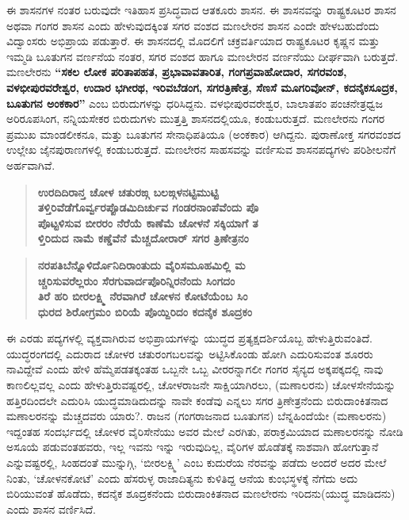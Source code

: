 ಈ ಶಾಸನಗಳ ನಂತರ ಬರುವುದೇ ಇತಿಹಾಸ ಪ್ರಸಿದ್ಧವಾದ ಆತಕೂರು ಶಾಸನ. ಈ ಶಾಸನವನ್ನು ರಾಷ್ಟ್ರಕೂಟರ ಶಾಸನ ಅಥವಾ ಗಂಗರ ಶಾಸನ ಎಂದು ಹೇಳುವುದಕ್ಕಿಂತ ಸಗರ ವಂಶದ ಮಣಲೇರನ ಶಾಸನ ಎಂದೇ ಹೇಳಬಹುದೆಂದು ವಿದ್ವಾಂಸರು ಅಭಿಪ್ರಾಯ ಪಡುತ್ತಾರೆ. ಈ ಶಾಸನದಲ್ಲಿ ಮೊದಲಿಗೆ ಚಕ್ರವರ್ತಿಯಾದ ರಾಷ್ಟ್ರಕೂಟರ ಕೃಷ್ಣನ ಮತ್ತು ಇಮ್ಮಡಿ ಬೂತುಗನ ವರ್ಣನೆಯ ನಂತರ, ಸಗರ ವಂಶದ ಹಾಗೂ ಮಣಲೇರನ ವರ್ಣನೆಯು ದೀರ್ಘವಾಗಿ ಬರುತ್ತದೆ. ಮಣಲೇರನು \textbf{“ಸಕಲ ಲೋಕ ಪರಿತಾಪಹತ, ಪ್ರಭಾವಾವತಾರಿತ, ಗಂಗಪ್ರವಾಹೋದಾರ, ಸಗರವಂಶ, ವಳಭೀಪುರವರೇಶ್ವರ, ಉದಾರ ಭಗೀರಥ, ಇರಿವಬೆಡಂಗ, ಸಗರತ್ರಿಣೇತ್ರ, ಸೆಣಸೆ ಮೂಗರಿವೋನ್​, ಕದನೈಕಸೂದ್ರಕ, ಬೂತುಗನ ಅಂಕಕಾರ”} ಎಂಬ ಬಿರುದುಗಳನ್ನು ಧರಿಸಿದ್ದನು. ವಳಭೀಪುರವರೇಶ್ವರ, ಬಾಲಾತಪಂ ಪಂಚನೇತ್ರಧ್ವಜ ಅರಿರೂಪಸಿಂಗ, ನನ್ನಿಯಸೇಕರ ಬಿರುದುಗಳು ಮುತ್ತತ್ತಿ ಶಾಸನದಲ್ಲಿಯೂ, ಕಂಡುಬರುತ್ತದೆ. ಮಣಲೇರನು ಗಂಗರ ಪ್ರಮುಖ ಮಾಂಡಲೀಕನೂ, ಮತ್ತು ಬೂತುಗನ ಸೇನಾಧಿಪತಿಯೂ (ಅಂಕಕಾರ) ಆಗಿದ್ದನು. ಪುರಾಣೋಕ್ತ ಸಗರವಂಶದ ಉಲ್ಲೇಖ ಜೈನಪುರಾಣಗಳಲ್ಲಿ ಕಂಡುಬರುತ್ತದೆ. ಮಣಲೇರನ ಸಾಹಸವನ್ನು ವರ್ಣಿಸುವ ಶಾಸನಪದ್ಯಗಳು ಪರಿಶೀಲನೆಗೆ ಅರ್ಹವಾಗಿವೆ.

\begin{verse}
\textbf{ಉರದಿದಿರಾನ್ತ ಚೋಳ ಚತುರಙ್ಗ ಬಲಙ್ಗಳನಟ್ಟಿಮುಟ್ಟಿ} \\\textbf{ತಳ್ತಿರಿವೆಡೆಗೊರ್ವ್ವರಪ್ಪೊಡಮಿದಿರ್ಚುವ ಗಂಡರನಾಂಪೆವೆಂದು ಪೊ} \\\textbf{ಪೊಟ್ಟಳಿಸುವ ಬೀರರಂ ನೆರೆಯೆ ಕಾಣೆಮೆ ಚೋಳನೆ ಸಕ್ಕಿಯಾಗೆ ತ} \\\textbf{ಳ್ತಿರಿದುದ ನಾಮೆ ಕಣ್ಡೆವೆನೆ ಮೆಚ್ಚದೋರಾರ್​ ಸಗರ ತ್ರಿಣೇತ್ರನಂ}
\end{verse}

\begin{verse}
\textbf{ನರಪತಿಬೆನ್ನೊಳಿರ್ದೊನಿದಿರಾಂತುದು ವೈರಿಸಮೂಹಮಿಲ್ಲಿ ಮ} \\\textbf{ಚ್ಚರಿಸುವರೆಲ್ಲರುಂ ಸೆರಗುವಾರ್ದಪೊರಿನ್ನಿರನೆಂದು ಸಿಂಗದಂ} \\\textbf{ತಿರೆ ಹರಿ ಬೀರಲಕ್ಷ್ಮಿ ನೆರವಾಗಿರೆ ಚೋಳನ ಕೋಟೆಯೆಂಬ ಸಿಂ} \\\textbf{ಧುರದ ಶಿರೋಗ್ರಮಂ ಬಿರಿಯೆ ಪೊಯ್ದಿರಿದಂ ಕದನೈಕ ಶೂದ್ರಕಂ}
\end{verse}

ಈ ಎರಡು ಪದ್ಯಗಳಲ್ಲಿ ವ್ಯಕ್ತವಾಗಿರುವ ಅಭಿಪ್ರಾಯಗಳನ್ನು ಯುದ್ಧದ ಪ್ರತ್ಯಕ್ಷದರ್ಶಿಯೊಬ್ಬ ಹೇಳುತ್ತಿರುವಂತಿದೆ. ಯುದ್ಧರಂಗದಲ್ಲಿ ಎದುರಾದ ಚೋಳರ ಚತುರಂಗಬಲವನ್ನು ಅಟ್ಟಿಸಿಕೊಂಡು ಹೋಗಿ ಎದುರಿಸುವಂತ ಶೂರರು ನಾವಿದ್ದೇವೆ ಎಂದು ಹೇಳಿ ಹೆಮ್ಮೆಪಡತಕ್ಕಂತಹ ಒಬ್ಬನೇ ಒಬ್ಬ ವೀರರನ್ನಾಗಲೀ ಗಂಗರ ಸೈನ್ಯದ ಅಕ್ಕಪಕ್ಕದಲ್ಲಿ ನಾವು ಕಾಣಲಿಲ್ಲವಲ್ಲ ಎಂದು ಹೇಳುತ್ತಿರುವಷ್ಟರಲ್ಲಿ, ಚೋಳರಾಜನೇ ಸಾಕ್ಷಿಯಾಗಿರಲು, (ಮಣಾಲರನು) ಚೋಳಸೇನೆಯನ್ನು ಹತ್ತಿರದಿಂದಲೇ ಎದುರಿಸಿ ಯುದ್ಧಮಾಡಿದುದನ್ನು ನಾವೇ ಕಂಡೆವು ಎನ್ನಲು ಸಗರ ತ್ರಿಣೇತ್ರನೆಂದು ಬಿರುದಾಂಕಿತನಾದ ಮಣಾಲರನನ್ನು ಮೆಚ್ಚದವರು ಯಾರು?. ರಾಜನ (ಗಂಗರಾಜನಾದ ಬೂತುಗನ) ಬೆನ್ನಹಿಂದೆಯೇ (ಮಣಾಲರನು) ಇದ್ದಂತಹ ಸಂದರ್ಭದಲ್ಲಿ ಚೋಳರ ವೈರಿಸೇನೆಯು ಅವರ ಮೇಲೆ ಎರಗಿತು, ಪರಾಕ್ರಮಿಯಾದ ಮಣಾಲರನನ್ನು ನೋಡಿ ಅಸೂಯೆ ಪಡುವಂತಹವರು, ಇಲ್ಲ ಇವನು ಇನ್ನು ಇರುವುದಿಲ್ಲ, ವೈರಿಗಳ ಹೊಡೆತಕ್ಕೆ ನಾಶವಾಗಿ ಹೋಗುತ್ತಾನೆ ಎನ್ನುವಷ್ಟರಲ್ಲಿ, ಸಿಂಹದಂತೆ ಮುನ್ನುಗ್ಗಿ, `ಬೀರಲಕ್ಷ್ಮಿ' ಎಂಬ ಕುದುರೆಯ ನೆರವನ್ನು ಪಡೆದು ಅಂದರೆ ಅದರ ಮೇಲೆ ನಿಂತು, `ಚೋಳನಕೋಟೆ' ಎಂದು ಹೆಸರುಳ್ಳ ರಾಜಾದಿತ್ಯನು ಕುಳಿತಿದ್ದ ಆನೆಯ ಕುಂಭಸ್ಥಳಕ್ಕೆ ನೆಗೆದು ಅದು ಬಿರಿಯುವಂತೆ ಹೊಡೆದು, ಕದನೈಕ ಶೂದ್ರಕನೆಂದು ಬಿರುದಾಂಕಿತನಾದ ಮಣಲೇರನು ಇರಿದನು(ಯುದ್ಧ ಮಾಡಿದನು) ಎಂದು ಶಾಸನ ವರ್ಣಿಸಿದೆ.

